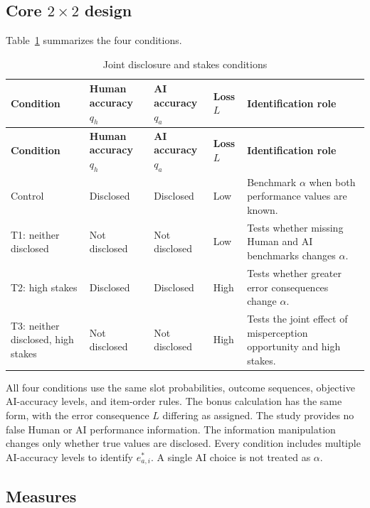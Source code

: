 \documentclass[11pt,a4paper]{article}
\begin{document}
\subsection{\texorpdfstring{Core $2\times2$ design}{Core 2 x 2 design}}

Table~\ref{tab:conditions} summarizes the four conditions.

\begin{longtable}{>{\RaggedRight\arraybackslash}p{}>{\RaggedRight\arraybackslash}p{}>{\RaggedRight\arraybackslash}p{}>{\RaggedRight\arraybackslash}p{}>{\RaggedRight\arraybackslash}p{}}
\caption{Joint disclosure and stakes conditions}\label{tab:conditions}\\
\toprule
\textbf{Condition} & \textbf{Human accuracy $q_h$} & \textbf{AI accuracy $q_a$} & \textbf{Loss $L$} & \textbf{Identification role}\\
\midrule
\endfirsthead
\toprule
\textbf{Condition} & \textbf{Human accuracy $q_h$} & \textbf{AI accuracy $q_a$} & \textbf{Loss $L$} & \textbf{Identification role}\\
\midrule
\endhead
Control & Disclosed & Disclosed & Low & Benchmark $\alpha$ when both performance values are known.\\
T1: neither disclosed & Not disclosed & Not disclosed & Low & Tests whether missing Human and AI benchmarks changes $\alpha$.\\
T2: high stakes & Disclosed & Disclosed & High & Tests whether greater error consequences change $\alpha$.\\
T3: neither disclosed, high stakes & Not disclosed & Not disclosed & High & Tests the joint effect of misperception opportunity and high stakes.\\
\bottomrule
\end{longtable}

All four conditions use the same slot probabilities, outcome sequences, objective AI-accuracy levels, and item-order rules. The bonus calculation has the same form, with the error consequence $L$ differing as assigned. The study provides no false Human or AI performance information. The information manipulation changes only whether true values are disclosed. Every condition includes multiple AI-accuracy levels to identify $e_{a,i}^{*}$. A single AI choice is not treated as $\alpha$.

\subsection{Measures}
\end{document}
